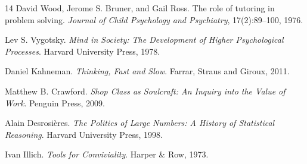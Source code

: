 \documentclass[11pt]{article}
\theoremstyle{remark}
\begin{document}
\begin{thebibliography}{14}
David Wood, Jerome S. Bruner, and Gail Ross.
\newblock The role of tutoring in problem solving.
\newblock \emph{Journal of Child Psychology and Psychiatry}, 17(2):89--100, 1976.

Lev S. Vygotsky.
\newblock \emph{Mind in Society: The Development of Higher Psychological Processes}.
\newblock Harvard University Press, 1978.

Daniel Kahneman.
\newblock \emph{Thinking, Fast and Slow}.
\newblock Farrar, Straus and Giroux, 2011.

Matthew B. Crawford.
\newblock \emph{Shop Class as Soulcraft: An Inquiry into the Value of Work}.
\newblock Penguin Press, 2009.

Alain Desrosières.
\newblock \emph{The Politics of Large Numbers: A History of Statistical Reasoning}.
\newblock Harvard University Press, 1998.

Ivan Illich.
\newblock \emph{Tools for Conviviality}.
\newblock Harper \& Row, 1973.

\end{thebibliography}
\end{document}
